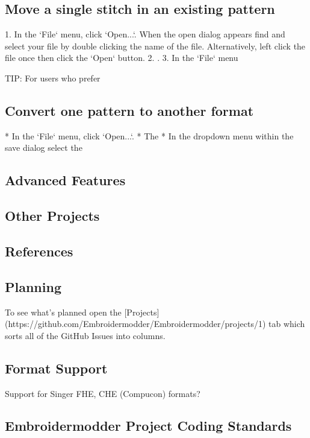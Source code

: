 \documentclass[a4paper]{report}
\begin{document}
{{{{{{\subsection{Move a single stitch in an existing pattern}

1. In the `File` menu, click `Open...`. When the open dialog appears find and select your file by double clicking the name of the file. Alternatively, left click the file once then click the `Open` button.
2. .
3. In the `File` menu

TIP: For users who prefer

\subsection{Convert one pattern to another format}

* In the `File` menu, click `Open...`.
* The
* In the dropdown menu within the save dialog select the

\subsection{Advanced Features}

\subsection{Other Projects}

\subsection{References}

\subsection{Planning}

To see what's planned open the
[Projects](https://github.com/Embroidermodder/Embroidermodder/projects/1)
tab which sorts all of the GitHub Issues into columns.

\subsection{Format Support}

Support for Singer FHE, CHE (Compucon) formats?

\subsection{Embroidermodder Project Coding Standards}

}}}}}}
\end{document}
